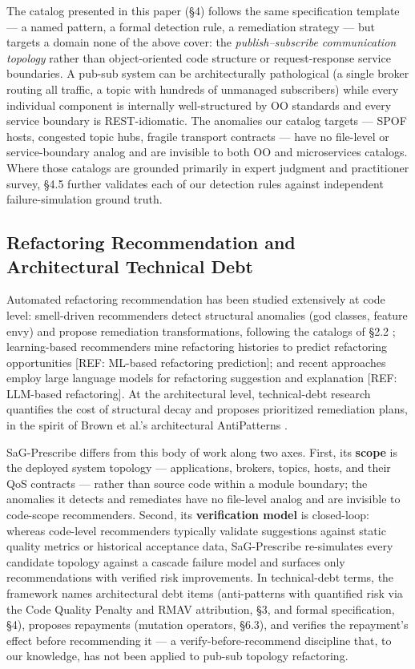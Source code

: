 \documentclass[11pt]{article}
\begin{document}
The catalog presented in this paper (\S4) follows the same specification template --- a named pattern,
a formal detection rule, a remediation strategy --- but targets a domain none of the above cover: the
\emph{publish--subscribe communication topology} rather than object-oriented code structure or
request-response service boundaries. A pub-sub system can be architecturally pathological (a single
broker routing all traffic, a topic with hundreds of unmanaged subscribers) while every individual
component is internally well-structured by OO standards and every service boundary is REST-idiomatic.
The anomalies our catalog targets --- SPOF hosts, congested topic hubs, fragile transport contracts ---
have no file-level or service-boundary analog and are invisible to both OO and microservices catalogs.
Where those catalogs are grounded primarily in expert judgment and practitioner survey, \S4.5 further
validates each of our detection rules against independent failure-simulation ground truth.

\subsection{Refactoring Recommendation and Architectural Technical Debt}

Automated refactoring recommendation has been studied extensively at code level: smell-driven
recommenders detect structural anomalies (god classes, feature envy) and propose remediation
transformations, following the catalogs of \S2.2 \cite{Fowler1999,Suryanarayana2014}; learning-based
recommenders mine refactoring histories to predict refactoring opportunities [REF: ML-based
refactoring prediction]; and recent approaches employ large language models for refactoring suggestion
and explanation [REF: LLM-based refactoring]. At the architectural level, technical-debt research
quantifies the cost of structural decay and proposes prioritized remediation plans, in the spirit of
Brown et al.'s architectural AntiPatterns \cite{Brown1998}.

SaG-Prescribe differs from this body of work along two axes. First, its \textbf{scope} is the deployed
system topology --- applications, brokers, topics, hosts, and their QoS contracts --- rather than
source code within a module boundary; the anomalies it detects and remediates have no file-level
analog and are invisible to code-scope recommenders. Second, its \textbf{verification model} is
closed-loop: whereas code-level recommenders typically validate suggestions against static quality
metrics or historical acceptance data, SaG-Prescribe re-simulates every candidate topology against a
cascade failure model and surfaces only recommendations with verified risk improvements. In
technical-debt terms, the framework names architectural debt items (anti-patterns with quantified risk
via the Code Quality Penalty and RMAV attribution, \S3, and formal specification, \S4), proposes
repayments (mutation operators, \S6.3), and verifies the repayment's effect before recommending it ---
a verify-before-recommend discipline that, to our knowledge, has not been applied to pub-sub topology
refactoring.
\end{document}
